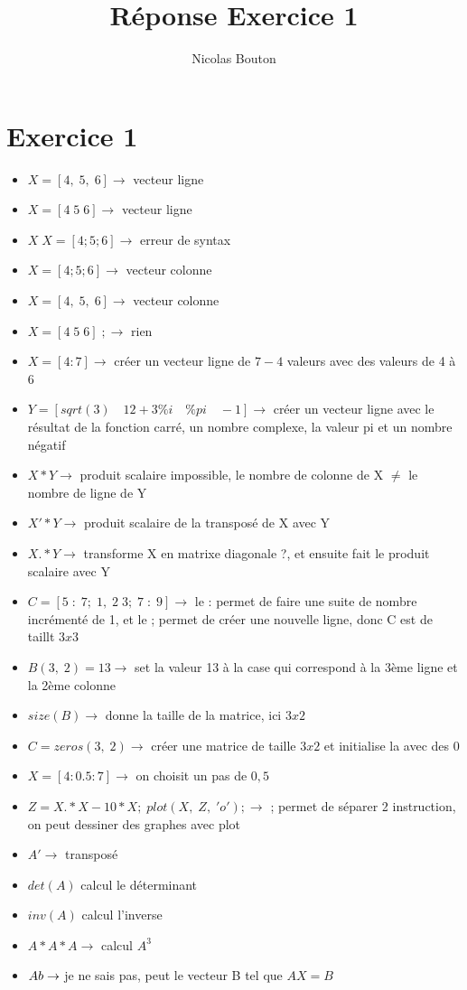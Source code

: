 \documentclass[12pt, letterpaper]{article}
\title{Réponse Exercice 1}
\author{Nicolas Bouton}
\begin{document}
\begin{titlepage}
\maketitle
\end{titlepage}

\section{Exercice 1}

\begin{itemize}
\item $X = [4,\; 5, \; 6] \rightarrow$ vecteur ligne
\item $X = [4 \; 5 \; 6] \rightarrow$ vecteur ligne
\item $X\;X = [4;5;6] \rightarrow$ erreur de syntax
\item $X = [4;5;6] \rightarrow$ vecteur colonne
\item $X = [4, \; 5, \; 6] \rightarrow$ vecteur colonne
\item $X = [4 \; 5 \; 6] \; ; \rightarrow$ rien
\item $X = [4:7] \rightarrow$ créer un vecteur ligne de $7-4$ valeurs avec des valeurs de 4 à 6
\item $Y = [sqrt(3) \quad 12+3\%i \quad \%pi \quad -1] \rightarrow$ créer un vecteur ligne avec le résultat de la fonction carré, un nombre complexe, la valeur pi et un nombre négatif
\item $X*Y \rightarrow$ produit scalaire impossible, le nombre de colonne de X $\neq$ le nombre de ligne de Y
\item $X'*Y \rightarrow$ produit scalaire de la transposé de X avec Y
\item $X.*Y \rightarrow$ transforme X en matrixe diagonale ?, et ensuite fait le produit scalaire avec Y
\item $C = [5 \; : \; 7; \; 1, \; 2 \; 3; \; 7 \; : \; 9] \rightarrow$ le : permet de faire une suite de nombre incrémenté de 1, et le ; permet de créer une nouvelle ligne, donc C est de taillt $3x3$
\item $B(3, \; 2) = 13 \rightarrow$ set la valeur 13 à la case qui correspond à la 3ème ligne et la 2ème colonne
\item $size(B) \rightarrow$ donne la taille de la matrice, ici $3x2$
\item $C = zeros(3, \; 2) \rightarrow$ créer une matrice de taille $3x2$ et initialise la avec des 0
\item $X = [4:0.5:7] \rightarrow$ on choisit un pas de $0,5$
\item $Z = X.*X-10*X; \; plot(X, \; Z, \; 'o'); \rightarrow$ ; permet de séparer 2 instruction, on peut dessiner des graphes avec plot
\item $A' \rightarrow$ transposé
\item $det(A)$ calcul le déterminant
\item $inv(A)$ calcul l'inverse
\item $A*A*A \rightarrow$ calcul $A^3$
\item $A\\b \rightarrow$ je ne sais pas, peut le vecteur B tel que $AX = B$
\end{itemize}
\end{document}
